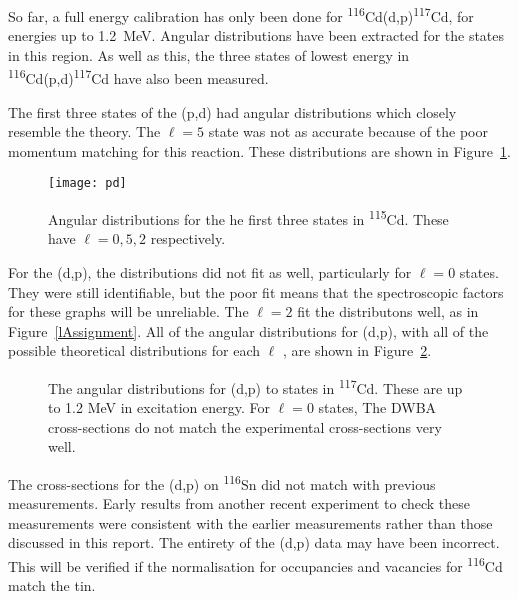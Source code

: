 So far, a full energy calibration has only been done for \textsuperscript{116}Cd(d,p)\textsuperscript{117}Cd, for energies up to \SI{1.2}{\mega\electronvolt}. Angular distributions have been extracted for the states in this region. As well as this, the three states of lowest energy in \textsuperscript{116}Cd(p,d)\textsuperscript{117}Cd have also been measured.

The first three states of the (p,d) had angular distributions which closely resemble the theory. The $\ell = 5$ state was not as accurate because of the poor momentum matching for this reaction. These distributions are shown in Figure~\ref{pdDistributions}.


\begin{figure}[h]	
\hspace*{-0.5cm}
\begin{center}	
	\texttt{[image: pd]}
\end{center}
			\caption[\textsuperscript{116}Cd(p,d)\textsuperscript{115}Cd angular distributions for the strongest states ]{Angular distributions for the he first three states in \textsuperscript{115}Cd. These have $\ell = 0,5,2$ respectively.}
		\label{pdDistributions}
\end{figure}
\FloatBarrier

For the (d,p), the distributions did not fit as well, particularly for $\ell = 0$ states. They were still identifiable, but the poor fit means that the spectroscopic factors for these graphs will be unreliable. The $\ell = 2$
fit the distributons well, as in Figure~\ref{lAssignment}. All of the angular distributions for (d,p), with all of the  possible theoretical distributions for each $\ell$ , are shown in Figure~\ref{dpDistributions}.

\begin{figure}[h]	
\vspace*{-2cm}
    \makebox[\linewidth]{
        \texttt{[image: dp]}	
		}
			\caption[The angular distributions for (d,p) reactions to states in \textsuperscript{117}Cd]{The angular distributions for (d,p) to states in \textsuperscript{117}Cd. These are up to 1.2 MeV in excitation energy. For $\ell = 0$ states, The DWBA cross-sections do not match the experimental cross-sections very well.}
		\label{dpDistributions}
\end{figure}
\FloatBarrier


The cross-sections for the (d,p) on \textsuperscript{116}Sn did not match with previous measurements\cite{stuart}. Early results from another recent experiment to check these measurements were consistent with the earlier measurements rather than those discussed in this report. The entirety of the (d,p) data may have been incorrect. This will be verified if the normalisation for occupancies and vacancies for \textsuperscript{116}Cd match the tin.